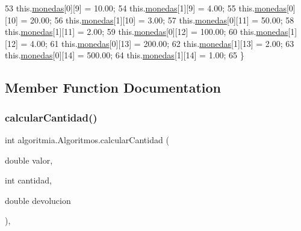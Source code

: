 \begin{DoxyCode}
53         this.\mbox{\hyperlink{classalgoritmia_1_1_algoritmos_a3f6bbaa8358a204e6dc486d7e818146f}{monedas}}[0][9] = 10.00;
54         this.\mbox{\hyperlink{classalgoritmia_1_1_algoritmos_a3f6bbaa8358a204e6dc486d7e818146f}{monedas}}[1][9] = 4.00;
55         this.\mbox{\hyperlink{classalgoritmia_1_1_algoritmos_a3f6bbaa8358a204e6dc486d7e818146f}{monedas}}[0][10] = 20.00;
56         this.\mbox{\hyperlink{classalgoritmia_1_1_algoritmos_a3f6bbaa8358a204e6dc486d7e818146f}{monedas}}[1][10] = 3.00;
57         this.\mbox{\hyperlink{classalgoritmia_1_1_algoritmos_a3f6bbaa8358a204e6dc486d7e818146f}{monedas}}[0][11] = 50.00;
58         this.\mbox{\hyperlink{classalgoritmia_1_1_algoritmos_a3f6bbaa8358a204e6dc486d7e818146f}{monedas}}[1][11] = 2.00;
59         this.\mbox{\hyperlink{classalgoritmia_1_1_algoritmos_a3f6bbaa8358a204e6dc486d7e818146f}{monedas}}[0][12] = 100.00;
60         this.\mbox{\hyperlink{classalgoritmia_1_1_algoritmos_a3f6bbaa8358a204e6dc486d7e818146f}{monedas}}[1][12] = 4.00;
61         this.\mbox{\hyperlink{classalgoritmia_1_1_algoritmos_a3f6bbaa8358a204e6dc486d7e818146f}{monedas}}[0][13] = 200.00;
62         this.\mbox{\hyperlink{classalgoritmia_1_1_algoritmos_a3f6bbaa8358a204e6dc486d7e818146f}{monedas}}[1][13] = 2.00;
63         this.\mbox{\hyperlink{classalgoritmia_1_1_algoritmos_a3f6bbaa8358a204e6dc486d7e818146f}{monedas}}[0][14] = 500.00;
64         this.\mbox{\hyperlink{classalgoritmia_1_1_algoritmos_a3f6bbaa8358a204e6dc486d7e818146f}{monedas}}[1][14] = 1.00;
65     \}
\end{DoxyCode}


\subsection{Member Function Documentation}
\mbox{\label{classalgoritmia_1_1_algoritmos_a7c37ed16dedcd133fa5a9a7dec5a734a}} 
\subsubsection{\texorpdfstring{calcular\+Cantidad()}{calcularCantidad()}}
{\footnotesize\ttfamily int algoritmia.\+Algoritmos.\+calcular\+Cantidad (\begin{DoxyParamCaption}\item[{double}]{valor,  }\item[{int}]{cantidad,  }\item[{double}]{devolucion }\end{DoxyParamCaption})\hspace{0.3cm}{\ttfamily [inline]}, {\ttfamily [private]}}


